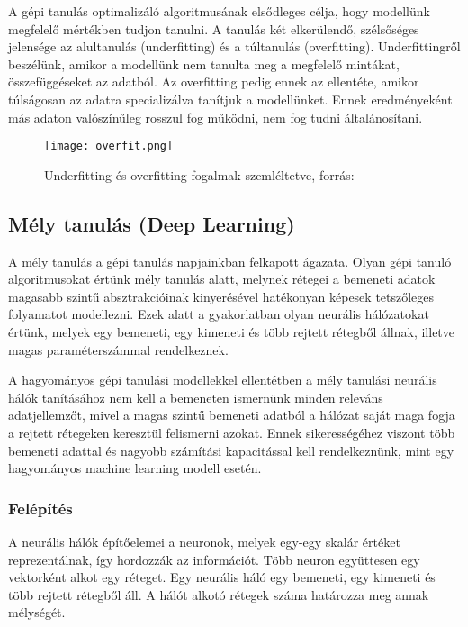 A gépi tanulás optimalizáló algoritmusának elsődleges célja, hogy modellünk megfelelő mértékben tudjon tanulni. A tanulás két elkerülendő, szélsőséges jelensége az alultanulás (underfitting) és a túltanulás (overfitting). Underfittingről beszélünk, amikor a modellünk nem tanulta meg a megfelelő mintákat, összefüggéseket az adatból. Az overfitting pedig ennek az ellentéte, amikor túlságosan az adatra specializálva tanítjuk a modellünket. Ennek eredményeként más adaton valószínűleg rosszul fog működni, nem fog tudni általánosítani.

\begin{figure}[H]
  \texttt{[image: overfit.png]}
  \caption{Underfitting és overfitting fogalmak szemléltetve, forrás: \cite{deeplearningbook}}
\end{figure}


\subsection{Mély tanulás (Deep Learning)}

A mély tanulás a gépi tanulás napjainkban felkapott ágazata. Olyan gépi tanuló algoritmusokat értünk mély tanulás alatt, melynek rétegei a bemeneti adatok magasabb szintű absztrakcióinak kinyerésével hatékonyan képesek tetszőleges folyamatot modellezni. Ezek alatt a gyakorlatban olyan neurális hálózatokat értünk, melyek egy bemeneti, egy kimeneti és több rejtett rétegből állnak, illetve magas paraméterszámmal rendelkeznek. \cite{azuredl}

A hagyományos gépi tanulási modellekkel ellentétben a mély tanulási neurális hálók tanításához nem kell a bemeneten ismernünk minden releváns adatjellemzőt, mivel a magas szintű bemeneti adatból a hálózat saját maga fogja a rejtett rétegeken keresztül felismerni azokat. Ennek sikerességéhez viszont több bemeneti adattal és nagyobb számítási kapacitással kell rendelkeznünk, mint egy hagyományos machine learning modell esetén. \cite{azuredl}

\subsubsection{Felépítés}

A neurális hálók építőelemei a neuronok, melyek egy-egy skalár értéket reprezentálnak, így hordozzák az információt. Több neuron együttesen egy vektorként alkot egy réteget. Egy neurális háló egy bemeneti, egy kimeneti és több rejtett rétegből áll. A hálót alkotó rétegek száma határozza meg annak mélységét. \cite{Choi2017}

